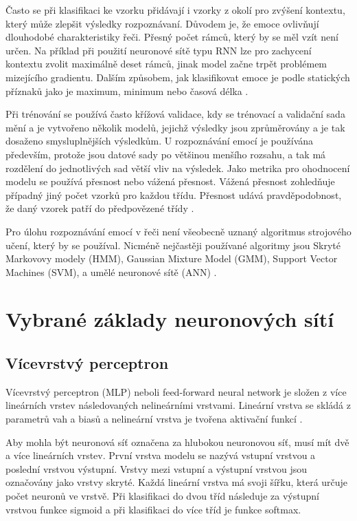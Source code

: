 \documentclass[FM,BP]{tulthesis}
\begin{document}
Často se při klasifikaci ke vzorku přidávají i vzorky z okolí pro zvýšení kontextu, který může zlepšit výsledky rozpoznávaní. Důvodem je, že emoce ovlivňují dlouhodobé charakteristiky řeči. Přesný počet rámců, který by se měl vzít není určen. Na příklad při použití neuronové sítě typu RNN lze pro zachycení kontextu zvolit maximálně deset rámců, jinak model začne trpět problémem mizejícího gradientu. Dalším způsobem, jak klasifikovat emoce je podle statických příznaků jako je maximum, minimum nebo časová délka \cite{konar_chakraborty_2015}.

Při trénování se používá často křížová validace, kdy se trénovací a validační sada mění a je vytvořeno několik modelů, jejichž výsledky jsou zprůměrovány a je tak dosaženo smysluplnějších výsledkům. U rozpoznávání emocí je používána především, protože jsou datové sady po většinou menšího rozsahu, a tak má rozdělení do jednotlivých sad větší vliv na výsledek. Jako metrika pro ohodnocení modelu se používá přesnost nebo vážená přesnost. Vážená přesnost zohledňuje případný jiný počet vzorků pro každou třídu. Přesnost udává pravděpodobnost, že daný vzorek patří do předpovězené třídy \cite{konar_chakraborty_2015}.

Pro úlohu rozpoznávání emocí v řeči není všeobecně uznaný algoritmus strojového učení, který by se používal. Nicméně nejčastěji používané algoritmy jsou Skryté Markovovy modely (HMM), Gaussian Mixture Model (GMM), Support Vector Machines (SVM), a umělé neuronové sítě (ANN) \cite{DBLP:journals/speech/AkcayO20}.

\chapter{Vybrané základy neuronových sítí}

\section{Vícevrstvý perceptron} %
Vícevrstvý perceptron (MLP) neboli feed-forward neural network je složen z více lineárních vrstev následovaných nelineárními vrstvami. Lineární vrstva se skládá z parametrů vah a biasů a nelineární vrstva je tvořena aktivační funkcí \cite{DBLP:books/lib/Bishop07}.

Aby mohla být neuronová síť označena za hlubokou neuronovou síť, musí mít dvě a více lineárních vrstev. První vrstva modelu se nazývá vstupní vrstvou a poslední vrstvou výstupní. Vrstvy mezi vstupní a výstupní vrstvou jsou označovány jako vrstvy skryté. Každá lineární vrstva má svoji šířku, která určuje počet neuronů ve vrstvě. Při klasifikaci do dvou tříd následuje za výstupní vrstvou funkce sigmoid a při klasifikaci do více tříd je funkce softmax.
\end{document}
